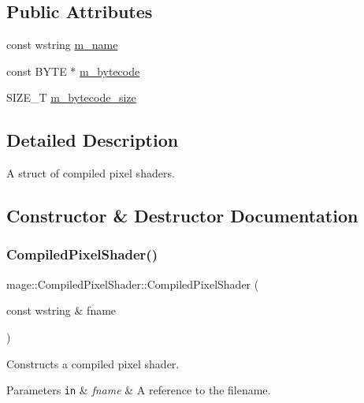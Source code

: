 \subsection*{Public Attributes}
\begin{DoxyCompactItemize}
\item 
const wstring \hyperlink{structmage_1_1_compiled_pixel_shader_ae87a10c9288429db9a607182a0ef2b39}{m\+\_\+name}
\item 
const B\+Y\+TE $\ast$ \hyperlink{structmage_1_1_compiled_pixel_shader_a2adf1a1c219968ecf2f47b1aa01a67cb}{m\+\_\+bytecode}
\item 
S\+I\+Z\+E\+\_\+T \hyperlink{structmage_1_1_compiled_pixel_shader_ac0b980e08fad328ac4774820b30208aa}{m\+\_\+bytecode\+\_\+size}
\end{DoxyCompactItemize}


\subsection{Detailed Description}
A struct of compiled pixel shaders. 

\subsection{Constructor \& Destructor Documentation}
\hypertarget{structmage_1_1_compiled_pixel_shader_a1c8cc509e405a53456dff36c204ec353}{}\label{structmage_1_1_compiled_pixel_shader_a1c8cc509e405a53456dff36c204ec353} 
\subsubsection{\texorpdfstring{Compiled\+Pixel\+Shader()}{CompiledPixelShader()}\hspace{0.1cm}{\footnotesize\ttfamily [1/4]}}
{\footnotesize\ttfamily mage\+::\+Compiled\+Pixel\+Shader\+::\+Compiled\+Pixel\+Shader (\begin{DoxyParamCaption}\item[{const wstring \&}]{fname }\end{DoxyParamCaption})\hspace{0.3cm}{\ttfamily [explicit]}}

Constructs a compiled pixel shader.


\begin{DoxyParams}[1]{Parameters}
\mbox{\tt in}  & {\em fname} & A reference to the filename. \\
\hline
\end{DoxyParams}

